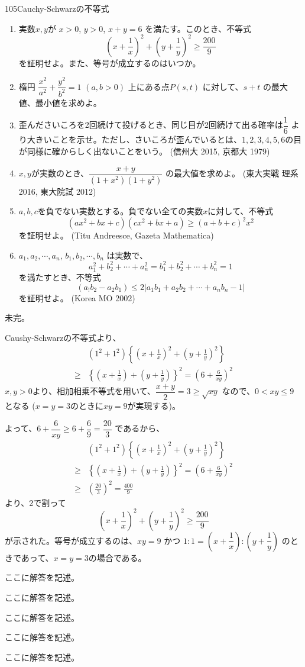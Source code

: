 \begin{prob}{105}{}{Cauchy-Schwarzの不等式}
 \begin{enumerate}
  \item 実数$x, y$が $x>0$, $y>0$, $x+y=6$ を満たす。このとき、不等式
	\[ \left(x+\frac{1}{x}\right)^2+\left(y+\frac{1}{y}\right)^2 \geq \frac{200}{9}	\]
	を証明せよ。また、等号が成立するのはいつか。
  \item 楕円 $\dfrac{x^2}{a^2}+\dfrac{y^2}{b^2}=1$ $(a, b>0)$ 上にある点$P(s,t)$ に対して、$s+t$ の最大値、最小値を求めよ。
  \item 歪んださいころを2回続けて投げるとき、同じ目が2回続けて出る確率は$\dfrac{1}{6}$ より大きいことを示せ。ただし、さいころが歪んでいるとは、$1, 2, 3, 4, 5, 6$の目が同様に確からしく出ないことをいう。 (信州大 2015, 京都大 1979)
  \item $x, y$が実数のとき、$\dfrac{x+y}{(1+x^2)(1+y^2)}$ の最大値を求めよ。 (東大実戦 理系 2016, 東大院試 2012)
  \item $a, b, c$を負でない実数とする。負でない全ての実数$x$に対して、不等式
	\[ (ax^2+bx+c)(cx^2+bx+a)\ge (a+b+c)^2 x^2 \]
	を証明せよ。 (Titu Andreesce, Gazeta Mathematica)
  \item $a_1, a_2, \cdots, a_n$, $b_1, b_2, \cdots, b_n$ は実数で、
	\[ a_1^2+b_2^2+\cdots +a_n^2=b_1^2+b_2^2+\cdots +b_n^2=1 \]
	を満たすとき、不等式
	\[ (a_!b_2-a_2b_1) \le 2\left|a_1b_1+a_2b_2+\cdots +a_nb_n -1 \right| \]
	を証明せよ。 (Korea MO 2002)
 \end{enumerate}
\end{prob}
未完。

Caushy-Schwarzの不等式より、
\begin{align*}
 &(1^2+1^2)\left\{\left(x+\frac{1}{x}\right)^2+\left(y+\frac{1}{y}\right)^2\right\} \\
 \geq &\left\{\left(x+\frac{1}{x}\right)+\left(y+\frac{1}{y}\right)\right\}^2 = \left(6+\frac{6}{xy}\right)^2
\end{align*}
$x, y > 0$より、相加相乗不等式を用いて、$\dfrac{x+y}{2}=3\geq\sqrt{xy}$ なので、$0<xy\leq 9$ となる ($x=y=3$のときに$xy=9$が実現する)。

よって、$6+\dfrac{6}{xy}\geq 6+\dfrac{6}{9}=\dfrac{20}{3}$ であるから、
\begin{align*}
 &(1^2+1^2)\left\{\left(x+\frac{1}{x}\right)^2+\left(y+\frac{1}{y}\right)^2\right\} \\
 \geq &\left\{\left(x+\frac{1}{x}\right)+\left(y+\frac{1}{y}\right)\right\}^2 = \left(6+\frac{6}{xy}\right)^2 \\
 \geq &\left(\frac{20}{3}\right)^2=\frac{400}{9}
\end{align*}
より、2で割って
\[ \left(x+\frac{1}{x}\right)^2+\left(y+\frac{1}{y}\right)^2 \geq \frac{200}{9} \]
が示された。等号が成立するのは、$xy=9$ かつ $1:1=\left(x+\dfrac{1}{x}\right):\left(y+\dfrac{1}{y}\right)$ のときであって、$x=y=3$の場合である。

ここに解答を記述。

ここに解答を記述。

ここに解答を記述。

ここに解答を記述。

ここに解答を記述。
